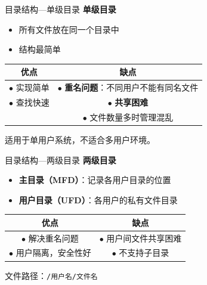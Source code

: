 \documentclass[10pt, aspectratio=169]{beamer}
\begin{document}
\begin{frame}{目录结构---单级目录}
    \textbf{单级目录}
    \begin{itemize}
        \item 所有文件放在同一个目录中
        \item 结构最简单
    \end{itemize}
    \vspace{0.5em}
    \begin{center}
        \begin{tabular}{|c|c|}
            \hline
            \textbf{优点} & \textbf{缺点} \\
            \hline
            $\bullet$ 实现简单 & $\bullet$ \textbf{重名问题}：不同用户不能有同名文件 \\
            $\bullet$ 查找快速 & $\bullet$ \textbf{共享困难} \\
            & $\bullet$ 文件数量多时管理混乱 \\
            \hline
        \end{tabular}
    \end{center}
    \vspace{0.5em}
    适用于单用户系统，不适合多用户环境。
\end{frame}

\begin{frame}{目录结构---两级目录}
    \textbf{两级目录}
    \begin{itemize}
        \item \textbf{主目录（MFD）}：记录各用户目录的位置
        \item \textbf{用户目录（UFD）}：各用户的私有文件目录
    \end{itemize}
    \vspace{0.5em}
    \begin{center}
        \begin{tabular}{|c|c|}
            \hline
            \textbf{优点} & \textbf{缺点} \\
            \hline
            $\bullet$ 解决重名问题 & $\bullet$ 用户间文件共享困难 \\
            $\bullet$ 用户隔离，安全性好 & $\bullet$ 不支持子目录 \\
            \hline
        \end{tabular}
    \end{center}
    \vspace{0.5em}
    文件路径：\texttt{/用户名/文件名}
\end{frame}
\end{document}
